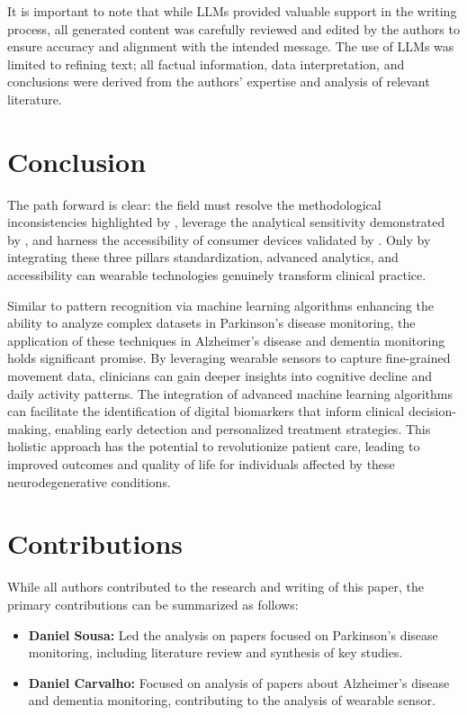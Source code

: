 \documentclass[sigconf,nonacm]{acmart}
\begin{document}
    It is important to note that while LLMs provided valuable support in the writing process, all generated content was carefully reviewed and edited by the authors to ensure accuracy and alignment with the intended message. The use of LLMs was limited to refining text; all factual information, data interpretation, and conclusions were derived from the authors' expertise and analysis of relevant literature.

\section{Conclusion}
    The path forward is clear: the field must resolve the methodological inconsistencies highlighted by \cite{Brognara2019GaitPD}, leverage the analytical sensitivity demonstrated by \cite{Sotirakis2023MotorProgressionPD}, and harness the accessibility of consumer devices validated by \cite{Schifino2025SmartwatchTremorPD}. Only by integrating these three pillars standardization, advanced analytics, and accessibility can wearable technologies genuinely transform clinical practice.

    Similar to pattern recognition via machine learning algorithms enhancing the ability to analyze complex datasets in Parkinson's disease monitoring, the application of these techniques in Alzheimer's disease and dementia monitoring holds significant promise. By leveraging wearable sensors to capture fine-grained movement data, clinicians can gain deeper insights into cognitive decline and daily activity patterns. The integration of advanced machine learning algorithms can facilitate the identification of digital biomarkers that inform clinical decision-making, enabling early detection and personalized treatment strategies. This holistic approach has the potential to revolutionize patient care, leading to improved outcomes and quality of life for individuals affected by these neurodegenerative conditions.

\section{Contributions}
    While all authors contributed to the research and writing of this paper, the primary contributions can be summarized as follows:
    \begin{itemize}
        \item \textbf{Daniel Sousa:} Led the analysis on papers focused on Parkinson's disease monitoring, including literature review and synthesis of key studies.
        \item \textbf{Daniel Carvalho:} Focused on analysis of papers about Alzheimer's disease and dementia monitoring, contributing to the analysis of wearable sensor.
    \end{itemize}



\end{document}
